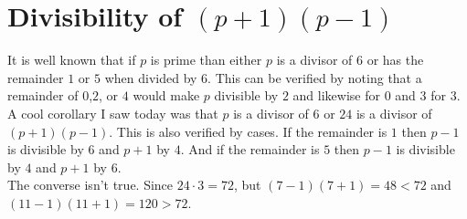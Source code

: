 
\section{Divisibility of $(p+1)(p-1)$}
It is well known that if $p$ is prime than either $p$ is a divisor of $6$ or has the remainder $1$ or $5$ when divided by $6$.
This can be verified by noting that a remainder of $0$,$2$, or $4$ would make $p$ divisible by $2$ and likewise for $0$ and $3$ for $3$.
\\

A cool corollary I saw today was that $p$ is a divisor of $6$ or $24$ is a divisor of $(p+1)(p-1)$.
This is also verified by cases.
If the remainder is $1$ then $p-1$ is divisible by $6$ and $p+1$ by $4$.
And if the remainder is $5$ then $p-1$ is divisible by $4$ and $p+1$ by $6$.
\\

The converse isn't true.
Since $24\cdot 3 = 72$,
but $(7-1)(7+1) = 48 < 72$ and $(11-1)(11+1) = 120 > 72$.
